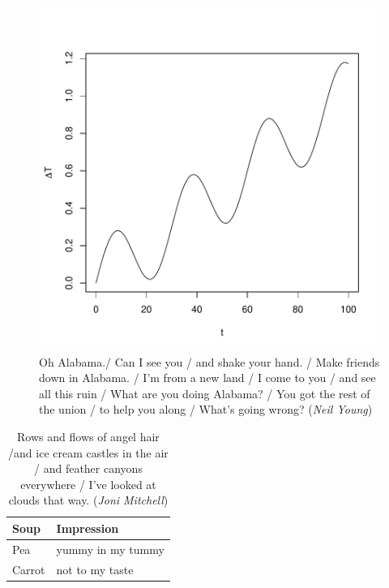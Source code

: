 \begin{figure}[htbp]
	\begin{center}
		\includegraphics[scale=1]{figure1} %
	\end{center}
	\caption[Normalized temperature rise in heated soup]{
	\label{f:wigglyline}
	Oh Alabama./
	Can I see you /
	and shake your hand. /
	Make friends down in Alabama. /
	I'm from a new land /
	I come to you /
	and see all this ruin /
	What are you doing Alabama? /
	You got the rest of the union /
	to help you along /
	What's going wrong?  (\emph{Neil Young})}
\end{figure}

\begin{table}
  \begin{center}
    \begin{tabular}{|l|l|}
      \hline
      Soup  & Impression\\
      \hline
      Pea  & yummy in my tummy\\
      Carrot & not to my taste\\
      \hline
    \end{tabular}
  \end{center}
  \caption[Food for thought]{\label{t:soup}  Rows and flows of angel hair /and ice cream castles in the air / and feather canyons everywhere / I've looked at clouds that way. (\emph{Joni Mitchell})}
\end{table}


